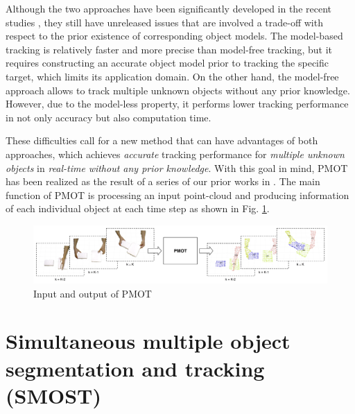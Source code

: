 \documentclass[a4paper,twoside, openright,12pt]{report}
\begin{document}
Although the two approaches have been significantly developed in the recent studies \cite{Rusu_ICRA2011_PCL, choi2013rgb, papon2013point, koo2013gmm, koo2013multiple, koo2014incremental, koo2014unsupervised, li2015realtime, papon2015spatially}, they still have unreleased issues that are involved a trade-off with respect to the prior existence of corresponding object models.
The model-based tracking is relatively faster and more precise than model-free tracking, but it requires constructing an accurate object model prior to tracking the specific target, which limits its application domain. On the other hand, the model-free approach allows to track multiple unknown objects without any prior knowledge. However, due to the model-less property, it performs lower tracking performance in not only accuracy but also computation time. 

These difficulties call for a new method that can have advantages of both
approaches, which achieves \textit{accurate} tracking performance for \textit{multiple unknown objects} in \textit{real-time} \textit{without any prior knowledge}.
With this goal in mind, PMOT has been realized as the result of a series of our prior works in \cite{koo2013gmm, koo2013multiple, koo2014incremental, koo2014unsupervised, li2015realtime}. 
The main function of PMOT is processing an input point-cloud and producing information of each individual object at each time step as shown in Fig. \ref{fig:pmot_problem}.
\begin{figure}[t]
	\centering
	\includegraphics[width=\linewidth]{fig/pmot_problem.png}
	\caption{Input and output of PMOT}
	\label{fig:pmot_problem}
\end{figure}

\section{Simultaneous multiple object segmentation and tracking (SMOST)}
\end{document}
